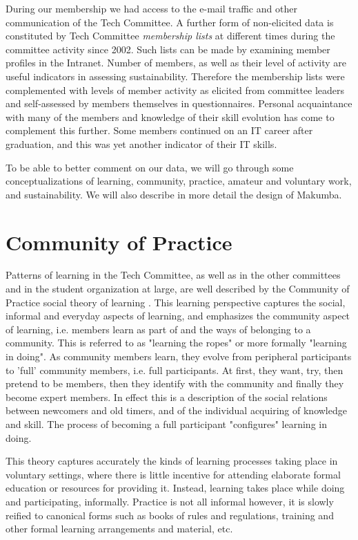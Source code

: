 \documentclass{acm_proc_article-sp}
\begin{document}
During our membership we had access to the e-mail traffic and other communication of the Tech Committee. A further form of non-elicited data is constituted by Tech Committee {\it membership lists} at different times during the committee activity since 2002. Such lists can be made by examining member profiles in the Intranet. Number of members, as well as their level of activity are useful indicators in assessing sustainability. Therefore the membership lists were complemented with levels of member activity as elicited from committee leaders and self-assessed by members themselves in questionnaires. Personal acquaintance with many of the members and knowledge of their skill evolution has come to complement this further. Some members continued on an IT career after graduation, and this was yet another indicator of their IT skills. 

To be able to better comment on our data, we will go through some conceptualizations of learning, community, practice, amateur and voluntary work, and sustainability. We will also describe in more detail the design of Makumba.

\section{Community of Practice}\label{sec:cop}
Patterns of learning in the Tech Committee, as well as in the other committees and in the student organization at large, are well described by the Community of Practice social theory of learning  \cite{lave_wenger91, wenger98}. This learning perspective captures the social, informal and everyday aspects of learning, and emphasizes the community aspect of learning, i.e. members learn as part of and the ways of belonging to a community. This is referred to as "learning the ropes" or more formally "learning in doing".  As community members learn, they evolve from peripheral participants to 'full' community members, i.e. full participants. At first, they want, try, then pretend to be members, then they identify with the community and finally they become expert members. 
In effect this is a description of the social relations between newcomers and old timers, and of the individual acquiring of knowledge and skill. The process of becoming a full participant "configures" learning in doing.

This theory captures accurately the kinds of learning processes taking place in voluntary settings, where there is little incentive for attending elaborate formal education or resources for providing it. Instead, learning takes place while doing and participating, informally.
Practice is not all informal however, it is slowly reified \cite{wenger98} to canonical forms such as books of rules and regulations, training and other formal learning arrangements and material, etc. 
\end{document}
